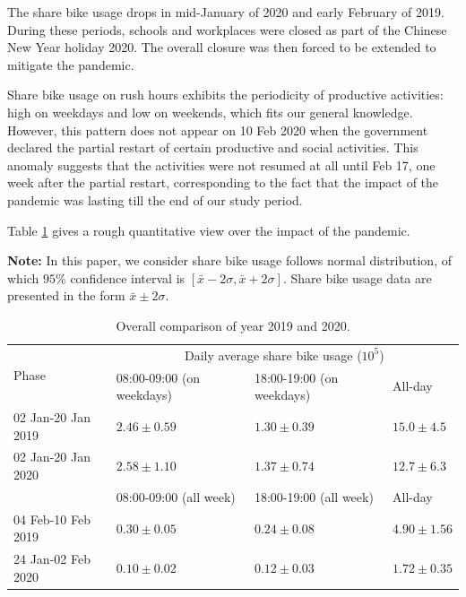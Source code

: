 \documentclass[ijgi,submit,moreauthors,pdftex]{Definitions/mdpi}
\begin{document}
The share bike usage drops in mid-January of 2020 and early February of 2019.
During these periods, schools and workplaces were closed as part of the Chinese New Year holiday 2020.
The overall closure was then forced to be extended to mitigate the pandemic.

Share bike usage on rush hours exhibits the periodicity of productive activities: high on weekdays and low on weekends, which fits our general knowledge.
However, this pattern does not appear on 10 Feb 2020 when the government declared the partial restart of certain productive and social activities.
This anomaly suggests that the activities were not resumed at all until Feb 17, one week after the partial restart, corresponding to the fact that the impact of the pandemic was lasting till the end of our study period.

Table \ref{tab:overall_comparison} gives a rough quantitative view over the impact of the pandemic.

\textbf{Note:} In this paper, we consider share bike usage follows normal distribution, of which $95\%$ confidence interval is $[\bar{x}-2\sigma,\bar{x}+2\sigma]$.
Share bike usage data are presented in the form $\bar{x}\pm2\sigma$.

\begin{table}[ht]
    \centering
    \begin{tabular}{|l|l|l|l|}
        \hline
        \multirow{2}{*}{Phase} &\multicolumn{3}{c|}{Daily average share bike usage ($10^{5}$)}\\
        \cline{2-4}
        & 08:00-09:00 (on weekdays) & 18:00-19:00 (on weekdays) & All-day\\
        \hline
        02 Jan-20 Jan 2019 & $2.46\pm0.59$ & $1.30\pm0.39$ & $15.0\pm4.5$\\
        \hline
        02 Jan-20 Jan 2020 & $2.58\pm1.10$ & $1.37\pm0.74$ & $12.7\pm6.3$\\
        \hline
        \hline
        & 08:00-09:00 (all week)  & 18:00-19:00 (all week) & All-day\\
        \hline
        04 Feb-10 Feb 2019 & $0.30\pm0.05$ & $0.24\pm0.08$ & $4.90\pm1.56$\\
        \hline
        24 Jan-02 Feb 2020 & $0.10\pm0.02$ & $0.12\pm0.03$ & $1.72\pm0.35$\\
        \hline
    \end{tabular}
    \caption{Overall comparison of year 2019 and 2020.}
    \label{tab:overall_comparison}
\end{table}
\end{document}
